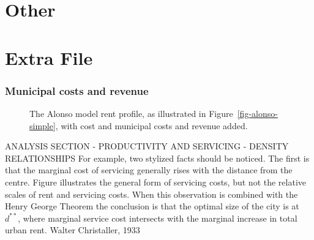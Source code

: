 \part{Other}










\part{Extra File}

\section{Municipal costs and revenue}

\begin{figure}
\begin{center}

\end{center}
\caption[The Alonso model with municipal costs and revenue.]{The Alonso model \gls{rent profile}, as illustrated in Figure~\ref{fig-alonso-simple}, with cost and municipal costs and revenue added.} %
\label{fig-municipal-costs}
\end{figure}
 

ANALYSIS SECTION - PRODUCTIVITY AND SERVICING - DENSITY RELATIONSHIPS For example, two stylized facts should be noticed. The first is that the marginal cost of servicing generally rises with the distance from the centre. Figure illustrates the general form of servicing costs, but not the relative scales of rent and servicing costs. When this observation is combined with the \gls{Henry George Theorem} the conclusion is that the optimal size of the city  is at  $d^{**}$, where marginal service cost intersects with the marginal increase in total urban rent.  Walter Christaller, 1933

